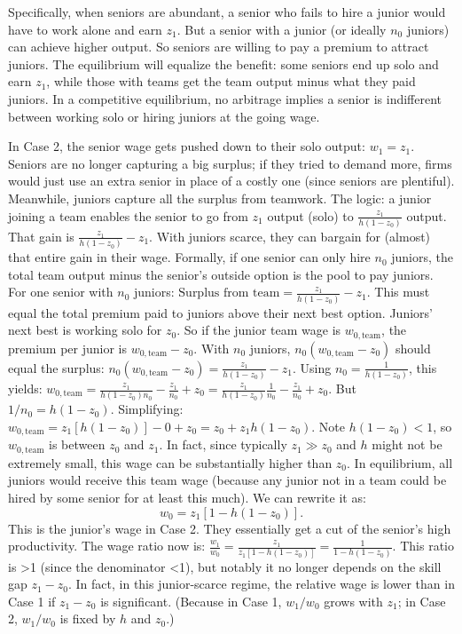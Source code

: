 \documentclass[12pt]{article}
\begin{document}
Specifically, when seniors are abundant, a senior who fails to hire a
junior would have to work alone and earn \(z_1\). But a senior with a
junior (or ideally \(n_0\) juniors) can achieve higher output. So
seniors are willing to pay a premium to attract juniors. The
equilibrium will equalize the benefit: some seniors end up solo and
earn \(z_1\), while those with teams get the team output minus what
they paid juniors. In a competitive equilibrium, no arbitrage implies
a senior is indifferent between working solo or hiring juniors at the
going wage.

In Case 2, the {senior wage gets pushed down to their solo
output}: \(w_1 = z_1.\) Seniors are no longer capturing a big surplus;
if they tried to demand more, firms would just use an extra senior in
place of a costly one (since seniors are plentiful). Meanwhile,
{juniors capture all the surplus from teamwork}. The logic: a
junior joining a team enables the senior to go from \(z_1\) output
(solo) to \(\frac{z_1}{h(1-z_0)}\) output. That gain is
\(\frac{z_1}{h(1-z_0)} - z_1\). With juniors scarce, they can bargain
for (almost) that entire gain in their wage. Formally, if one senior
can only hire \(n_0\) juniors, the total team output minus the
senior's outside option is the pool to pay juniors. For one senior
with \(n_0\) juniors:
\(\text{Surplus from team} = \frac{z_1}{h(1-z_0)} - z_1.\) This must
equal the total premium paid to juniors above their next best option.
Juniors' next best is working solo for \(z_0\). So if the junior team
wage is \(w_{0,\text{team}}\), the premium per junior is
\(w_{0,\text{team}} - z_0\). With \(n_0\) juniors,
\(n_0 (w_{0,\text{team}} - z_0)\) should equal the surplus:
\(n_0 (w_{0,\text{team}} - z_0) = \frac{z_1}{h(1-z_0)} - z_1.\) Using
\(n_0 = \frac{1}{h(1-z_0)}\), this yields:
\(w_{0,\text{team}} = \frac{z_1}{h(1-z_0) n_0} - \frac{z_1}{n_0} + z_0 = \frac{z_1}{h(1-z_0)} \frac{1}{n_0} - \frac{z_1}{n_0} + z_0.\)
But \(1/n_0 = h(1-z_0)\). Simplifying:
\(w_{0,\text{team}} = z_1 [h(1-z_0)] - 0 + z_0 = z_0 + z_1 h(1-z_0).\)
Note \(h(1-z_0) < 1\), so \(w_{0,\text{team}}\) is between \(z_0\) and
\(z_1\). In fact, since typically \(z_1 \gg z_0\) and \(h\) might not
be extremely small, this wage can be substantially higher than
\(z_0\). In equilibrium, all juniors would receive this team wage
(because any junior not in a team could be hired by some senior for at
least this much). We can rewrite it as: 
\begin{equation}
w_0 = z_1[1 - h
(1-z_0)]. \tag{6}
\end{equation}
This is the {junior's wage in Case 2}.
They essentially get a cut of the senior's high productivity. The
{wage ratio} now is:
\(\frac{w_1}{w_0} = \frac{z_1}{z_1[1 - h(1-z_0)]} = \frac{1}{1 - h(1-z_0)}.\)
This ratio is \textgreater1 (since the denominator \textless1), but
notably it no longer depends on the skill gap \(z_1 - z_0\). In fact,
in this junior-scarce regime, the {relative wage is lower} than
in Case 1 if \(z_1 - z_0\) is significant. (Because in Case 1,
\(w_1/w_0\) grows with \(z_1\); in Case 2, \(w_1/w_0\) is fixed by
\(h\) and \(z_0\).)
\end{document}
